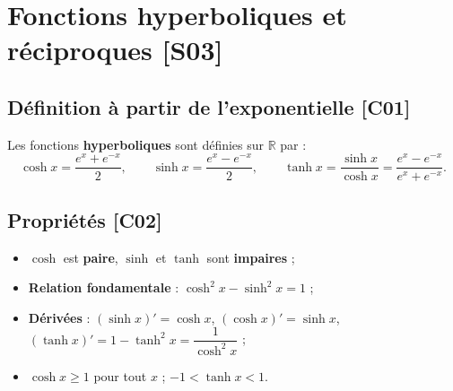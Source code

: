 \documentclass[a4paper,11pt]{article}
\begin{document}
\section{Fonctions hyperboliques et réciproques \hfill {\normalsize\color{uimmred}[S03]}}

\subsection{Définition à partir de l'exponentielle \hfill {\normalsize\color{uimmred}[C01]}}

\begin{definition}
Les fonctions \textbf{hyperboliques} sont définies sur $\mathbb{R}$ par :
\[
\cosh x = \frac{e^x + e^{-x}}{2}, \qquad
\sinh x = \frac{e^x - e^{-x}}{2}, \qquad
\tanh x = \frac{\sinh x}{\cosh x} = \frac{e^x - e^{-x}}{e^x + e^{-x}}.
\]
\end{definition}

\begin{center}
\end{center}

\subsection{Propriétés \hfill {\normalsize\color{uimmred}[C02]}}

\begin{theoreme}
\begin{itemize}
  \item $\cosh$ est \textbf{paire}, $\sinh$ et $\tanh$ sont \textbf{impaires} ;
  \item \textbf{Relation fondamentale} : $\cosh^2 x - \sinh^2 x = 1$ ;
  \item \textbf{Dérivées} : $(\sinh x)' = \cosh x$, \quad $(\cosh x)' = \sinh x$, \quad $(\tanh x)' = 1 - \tanh^2 x = \dfrac{1}{\cosh^2 x}$ ;
  \item $\cosh x \geq 1$ pour tout $x$ ; \quad $-1 < \tanh x < 1$.
\end{itemize}
\end{theoreme}
\end{document}
